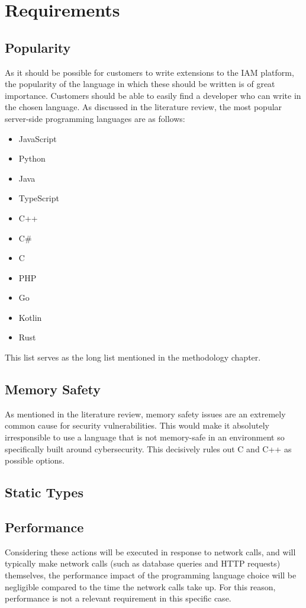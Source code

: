 \chapter{Requirements}
\label{ch:requirements}

\section{Popularity}
As it should be possible for customers to write extensions to the IAM platform, the popularity of the language in which these should be written is of great importance. Customers should be able to easily find a developer who can write in the chosen language. As discussed in the literature review, the most popular server-side programming languages are as follows:
\begin{itemize}
    \item JavaScript
    \item Python
    \item Java
    \item TypeScript
    \item C++
    \item C\#
    \item C
    \item PHP
    \item Go
    \item Kotlin
    \item Rust
\end{itemize}

This list serves as the long list mentioned in the methodology chapter.

\section{Memory Safety}
As mentioned in the literature review, memory safety issues are an extremely common cause for security vulnerabilities. This would make it absolutely irresponsible to use a language that is not memory-safe in an environment so specifically built around cybersecurity. This decisively rules out C and C++ as possible options.

\section{Static Types}

\section{Performance}
Considering these actions will be executed in response to network calls, and will typically make network calls (such as database queries and HTTP requests) themselves, the performance impact of the programming language choice will be negligible compared to the time the network calls take up. For this reason, performance is not a relevant requirement in this specific case.

